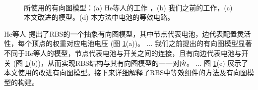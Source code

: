\documentclass[a4paper,UTF8]{ctexart}
\begin{document}
\begin{figure}[htbp]
    \centering
    \\
    \caption{
        所使用的有向图模型：(a) He等人的工作 \cite{heExploringAdaptiveReconfiguration2013}，(b) 我们之前的工作，(c) 本文改进的模型。(d) 本方法中电池的等效电路。
    }
    \label{fig:model}
\end{figure}

He等人 \cite{heExploringAdaptiveReconfiguration2013} 提出了RBS的一个抽象有向图模型，其中节点代表电池，边代表配置灵活性，每个顶点的权重对应电池电压 (图 \ref{fig:model}(a))。
...
我们之前提出的有向图模型显著不同于He等人的模型，节点代表电池与开关之间的连接，且有向边代表电池与开关 (图 \ref{fig:model}(b))，从而实现RBS结构与其有向图模型的一一对应。
...
图 \ref{fig:model}(c) 展示了本文使用的改进有向图模型。接下来详细解释了RBS中等效组件的方法及有向图模型的构建。
\end{document}

